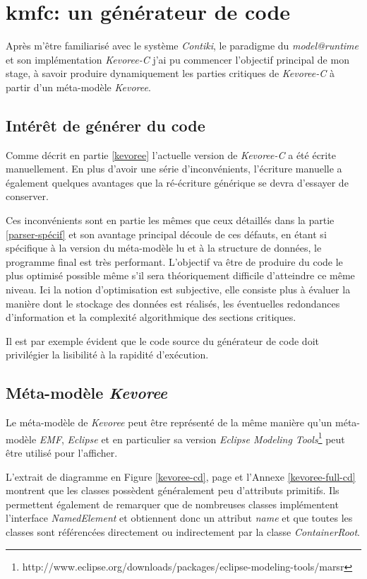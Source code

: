 \section{kmfc: un générateur de code}

Après m'être familiarisé avec le système \emph{Contiki}, le paradigme du \emph{model@runtime} et son implémentation \emph{Kevoree-C} j'ai pu commencer l'objectif principal de mon stage, à savoir produire dynamiquement les parties critiques de \emph{Kevoree-C} à partir d'un méta-modèle \emph{Kevoree}.

\subsection{Intérêt de générer du code}

Comme décrit en partie \ref{kevoree} l'actuelle version de \emph{Kevoree-C} a été écrite manuellement. En plus d'avoir une série d'inconvénients, l'écriture manuelle a également quelques avantages que la ré-écriture générique se devra d'essayer de conserver.

Ces inconvénients sont en partie les mêmes que ceux détaillés dans la partie \ref{parser-spécif} et son avantage principal découle de ces défauts, en étant si spécifique à la version du méta-modèle lu et à la structure de données, le programme final est très performant. L'objectif va être de produire du code le plus optimisé possible même s'il sera théoriquement difficile d'atteindre ce même niveau. Ici la notion d'optimisation est subjective, elle consiste plus à évaluer la manière dont le stockage des données est réalisés, les éventuelles redondances d'information et la complexité algorithmique des sections critiques.

Il est par exemple évident que le code source du générateur de code doit privilégier la lisibilité à la rapidité d'exécution.

\subsection{\label{mm-kevoree}Méta-modèle \emph{Kevoree}}

Le méta-modèle de \emph{Kevoree} peut être représenté de la même manière qu'un méta-modèle \emph{EMF}, \emph{Eclipse}\cite{eclipse} et en particulier sa version \emph{Eclipse Modeling Tools}\footnote{http://www.eclipse.org/downloads/packages/eclipse-modeling-tools/marsr} peut être utilisé pour l'afficher. 

L'extrait de diagramme en Figure \ref{kevoree-cd}, page \pageref{kevoree-cd} et l'Annexe \ref{kevoree-full-cd} montrent que les classes possèdent généralement peu d'attributs primitifs. Ils permettent également de remarquer que de nombreuses classes implémentent l'interface \emph{NamedElement} et obtiennent donc un attribut \emph{name} et que toutes les classes sont référencées directement ou indirectement par la classe \emph{ContainerRoot}.

